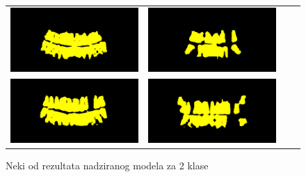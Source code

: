 \begin{figure}
\begin{tabular}{cccc}
\hspace{-1.5cm}
{\includegraphics[width = 8cm]{slike/rezultati/supervised2klase1.png}} &
{\includegraphics[width = 8cm]{slike/rezultati/supervised2klase2.png}}\\
\hspace{-1.5cm}
{\includegraphics[width = 8cm]{slike/rezultati/supervised2klase3.png}} &
{\includegraphics[width = 8cm]{slike/rezultati/supervised2klase4.png}}\\
\end{tabular}
\caption{Neki od rezultata nadziranog modela za 2 klase}
\end{figure}


